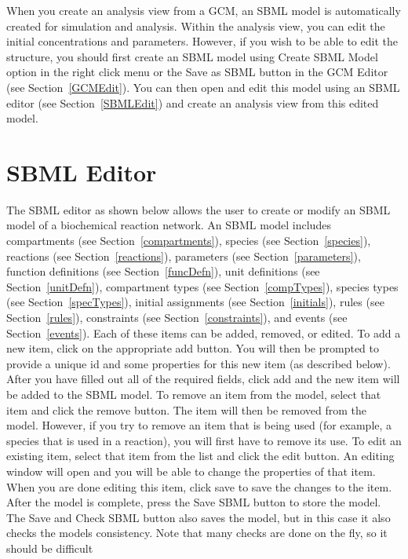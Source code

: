 \documentclass[titlepage,11pt]{article}
\begin{document}
When you create an analysis view from a GCM, an SBML model is
automatically created for simulation and analysis. Within the
analysis view, you can edit the initial concentrations and
parameters. However, if you wish to be able to edit the
structure, you should first create an SBML model using Create
SBML Model option in the right click menu or the Save as SBML button in
the GCM Editor (see Section~\ref{GCMEdit}).  You can then open and
edit this model using an SBML editor (see Section~\ref{SBMLEdit}) and
create an analysis view from this edited model.

\section{\label{SBMLEdit}SBML Editor}

\noindent
The SBML editor as shown below allows the user to create or modify an SBML
model of a biochemical reaction network.  An SBML model includes
compartments (see Section~\ref{compartments}), 
species (see Section~\ref{species}),
reactions (see Section~\ref{reactions}), 
parameters (see Section~\ref{parameters}),
function definitions (see Section~\ref{funcDefn}), 
unit definitions (see Section~\ref{unitDefn}), 
compartment types (see Section~\ref{compTypes}), 
species types (see Section~\ref{specTypes}),
initial assignments (see Section~\ref{initials}), 
rules (see Section~\ref{rules}), 
constraints (see Section~\ref{constraints}), and
events (see Section~\ref{events}).
Each of these items can be added, removed, or edited. 
To add a new item, click on the appropriate add button. You
will then be prompted to provide a unique id and some properties
for this new item (as described below). After you have filled out
all of the required fields, click add and the new item will be
added to the SBML model.
To remove an item from the model, select that item and click
the remove button. The item will then be removed from the model.
However, if you try to remove an item that is being used 
(for example, a species that is used in a reaction), you will first have 
to remove its use.
To edit an existing item, select that item from the list and
click the edit button. An editing window will open and you will
be able to change the properties of that item. When you are done
editing this item, click save to save the changes to the item. 
After the model is complete, press the Save SBML button to store
the model.  The Save and Check SBML button also saves the model, but
in this case it also checks the models consistency.
Note that many checks are done on the fly, so it should be difficult
\end{document}
